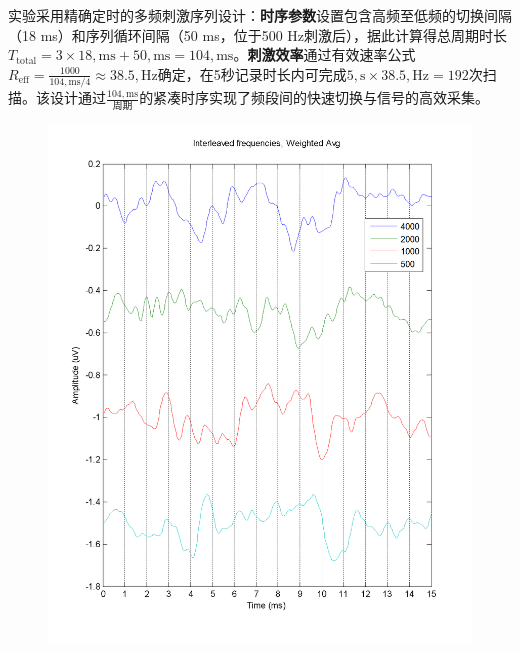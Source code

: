 实验采用精确定时的多频刺激序列设计：\textbf{时序参数}设置包含高频至低频的切换间隔（18 ms）和序列循环间隔（50 ms，位于500 Hz刺激后），据此计算得总周期时长$T_{\text{total}} = 3 \times 18,\text{ms} + 50,\text{ms} = 104,\text{ms}$。\textbf{刺激效率}通过有效速率公式$R_{\text{eff}} = \frac{1000}{104,\text{ms}/4} \approx 38.5,\text{Hz}$确定，在5秒记录时长内可完成$5,\text{s} \times 38.5,\text{Hz} = 192$次扫描。该设计通过$\frac{104,\text{ms}}{\text{周期}}$的紧凑时序实现了频段间的快速切换与信号的高效采集。
\begin{figure}[H]
    \centering
    \begin{minipage}{0.48\textwidth}
        \includegraphics[width=\textwidth]{images/Interleaved75dbGHINOMA-1.png}
    \end{minipage}
    \hfill
    \begin{minipage}{0.48\textwidth}

\end{minipage}
\end{figure}
